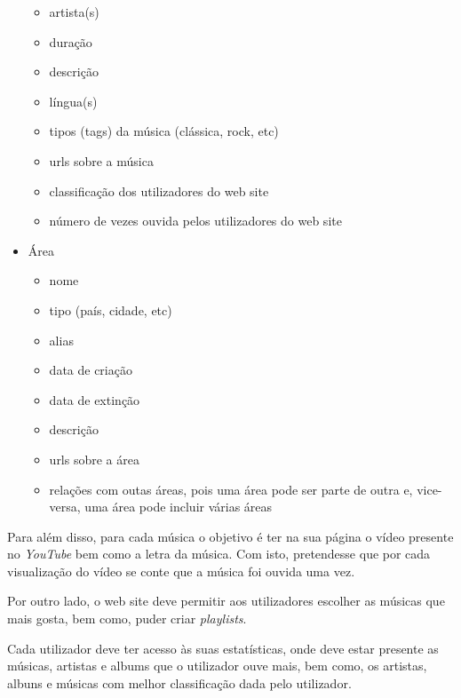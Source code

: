 \documentclass{article}
\begin{document}
\begin{itemize}
\begin{itemize}
            \item artista(s)
            \item duração
            \item descrição
            \item língua(s)
            \item tipos (tags) da música (clássica, rock, etc)
            \item urls sobre a música
            \item classificação dos utilizadores do web site
            \item número de vezes ouvida pelos utilizadores do web site
        \end{itemize}
    \item Área
        \begin{itemize}
            \item nome
            \item tipo (país, cidade, etc)
            \item alias
            \item data de criação
            \item data de extinção
            \item descrição
            \item urls sobre a área
            \item relações com outas áreas, pois uma área pode ser parte de outra e, vice-versa, uma área pode incluir várias áreas
        \end{itemize}
\end{itemize}

Para além disso, para cada música o objetivo é ter na sua página o vídeo presente no \textit{YouTube} bem como a letra da música. Com isto, pretendesse que por cada visualização do vídeo se conte que a música foi ouvida uma vez.

Por outro lado, o web site deve permitir aos utilizadores escolher as músicas que mais gosta, bem como, puder criar \textit{playlists}.

Cada utilizador deve ter acesso às suas estatísticas, onde deve estar presente as músicas, artistas e albums que o utilizador ouve mais, bem como, os artistas, albuns e músicas com melhor classificação dada pelo utilizador.
\end{document}
